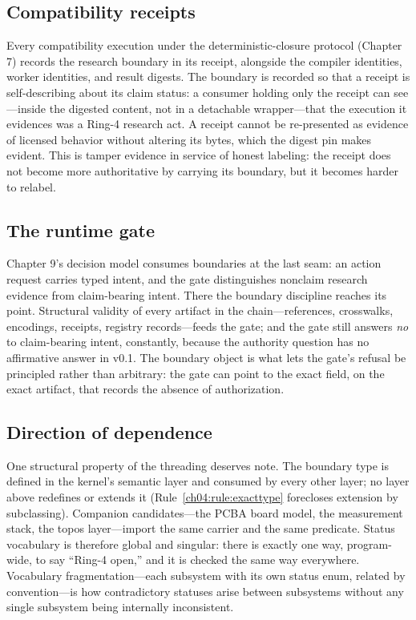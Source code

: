 \subsection{Compatibility receipts}

Every compatibility execution under the deterministic-closure protocol
(Chapter 7) records the research boundary in its receipt, alongside the
compiler identities, worker identities, and result digests. The boundary is
recorded so that a receipt is self-describing about its claim status: a
consumer holding only the receipt can see---inside the digested content, not
in a detachable wrapper---that the execution it evidences was a Ring-4
research act. A receipt cannot be re-presented as evidence of licensed
behavior without altering its bytes, which the digest pin makes evident.
This is tamper evidence in service of honest labeling: the receipt does not
become more authoritative by carrying its boundary, but it becomes harder to
relabel.

\subsection{The runtime gate}

Chapter 9's decision model consumes boundaries at the last seam: an action
request carries typed intent, and the gate distinguishes nonclaim research
evidence from claim-bearing intent. There the boundary discipline reaches
its point. Structural validity of every artifact in the chain---references,
crosswalks, encodings, receipts, registry records---feeds the gate; and the
gate still answers \emph{no} to claim-bearing intent, constantly, because
the authority question has no affirmative answer in v0.1. The boundary
object is what lets the gate's refusal be principled rather than arbitrary:
the gate can point to the exact field, on the exact artifact, that records
the absence of authorization.

\subsection{Direction of dependence}

One structural property of the threading deserves note. The boundary type is
defined in the kernel's semantic layer and consumed by every other layer;
no layer above redefines or extends it (Rule~\ref{ch04:rule:exacttype}
forecloses extension by subclassing). Companion candidates---the PCBA board
model, the measurement stack, the topos layer---import the same carrier and
the same predicate. Status vocabulary is therefore global and singular: there
is exactly one way, program-wide, to say ``Ring-4 open,'' and it is checked
the same way everywhere. Vocabulary fragmentation---each subsystem with its
own status enum, related by convention---is how contradictory statuses
arise between subsystems without any single subsystem being internally
inconsistent.

